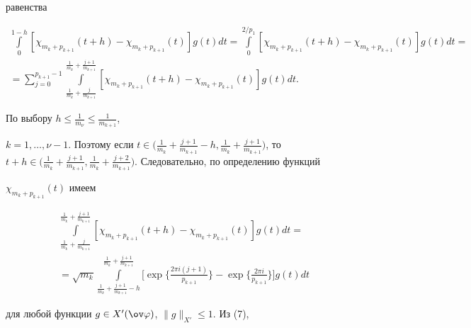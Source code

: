 \begin{pf}
равенства 


\begin{multline}


\int\limits_{0}^{1-h}[\chi_{m_{k}+p_{k+1}}(t+h)-\chi_{m_{k}+p_{k+1}}(t)] 


g(t)dt=\int\limits_{0}^{2/p_1}[\chi_{m_{k}+p_{k+1}}(t+h)-


\chi_{m_{k}+p_{k+1}}(t)] g(t)dt=\\


%


=\sum_{j=0}^{p_{k+1}-1}\int\limits_{\frac{1}{m_{k}}+\frac{j}{m_{k+1}}}^{


\frac{1}{m_{k}}+\frac{j+1}{m_{k+1}}}


[\chi_{m_{k}+p_{k+1}}(t+h)-\chi_{m_{k}+p_{k+1}}(t)] g(t)dt.


\end{multline}


По выбору $h\leq\frac{1}{m_{\nu}}\leq\frac{1}{m_{k+1}}$, 


$k=1,\dotsc,\nu-1$. Поэтому если $t\in 


\big(\frac{1}{m_{k}}+\frac{j+1}{m_{k+1}}-h, \frac{1}{m_{k}}+ 


\frac{j+1}{m_{k+1}}\big)$, то $t+h\in 


\big(\frac{1}{m_{k}}+\frac{j+1}{m_{k+1}}, \frac{1}{m_{k}}+ 


\frac{j+2}{m_{k+1}}\big)$. Следовательно, по определению функций 


$\chi_{m_{k}+p_{k+1}}(t)$ имеем 


\begin{multline}


\int\limits_{\frac{1}{m_{k}}+\frac{j}{m_{k+1}}}^{


\frac{1}{m_{k}}+\frac{j+1}{m_{k+1}}}


[\chi_{m_{k}+p_{k+1}}(t+h)-\chi_{m_{k}+p_{k+1}}(t)] g(t)dt= \\


%


=\sqrt{m_{k}}  


\int\limits_{\frac{1}{m_{k}}+\frac{j+1}{m_{k+1}}-h}^{\frac{1}{m_{k}}+\frac{j+1}{m_{k+1}}}


\bigg[\exp\bigg\{\frac{2\pi i(j+1)}{p_{k+1}}\bigg\}-


\exp\bigg\{\frac{2\pi i}{p_{k+1}}\bigg\}\bigg]g(t)dt


\end{multline}


для любой функции $g\in X'(\ov\varphi)$, $\|g\|_{X'}\leq 1$. Из (7), 



\end{pf}
